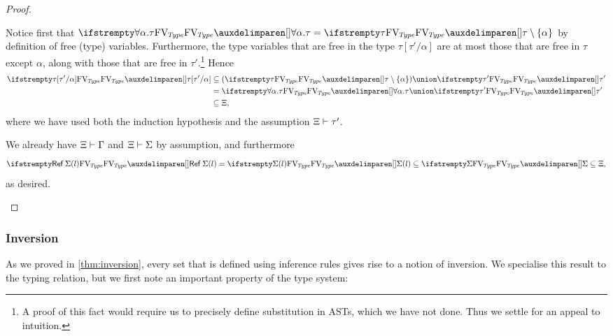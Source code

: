 \begin{proof}
\begin{proofsec}
    \item[\ruleref{TTapp}]
    Notice first that $\freeTvar{\typeForall{\alpha}{\tau}} = \freeTvar{\tau} \setminus \{\alpha\}$ by definition of free (type) variables. Furthermore, the type variables that are free in the type $\tau[\tau'/\alpha]$ are at most those that are free in $\tau$ except $\alpha$, along with those that are free in $\tau'$.\footnote{A proof of this fact would require us to precisely define substitution in ASTs, which we have not done. Thus we settle for an appeal to intuition.} Hence
    \begin{align*}
        \freeTvar{\tau[\tau'/\alpha]}
            &\subseteq (\freeTvar{\tau} \setminus \{\alpha\}) \union \freeTvar{\tau'} \\
            &= \freeTvar{\typeForall{\alpha}{\tau}} \union \freeTvar{\tau'} \\
            &\subseteq \Xi,
    \end{align*}
    where we have used both the induction hypothesis and the assumption $\Xi \vdash \tau'$.

    \item[\ruleref{Tloc}]
    We already have $\Xi \vdash \Gamma$ and $\Xi \vdash \Sigma$ by assumption, and furthermore
    \begin{equation*}
        \freeTvar{\typeRef{\Sigma(l)}}
            = \freeTvar{\Sigma(l)}
            \subseteq \freeTvar{\Sigma}
            \subseteq \Xi,
    \end{equation*}
    as desired.
\end{proofsec}
\end{proof}


\subsubsection{Inversion}

As we proved in \cref{thm:inversion}, every set that is defined using inference rules gives rise to a notion of inversion. We specialise this result to the typing relation, but we first note an important property of the type system:

